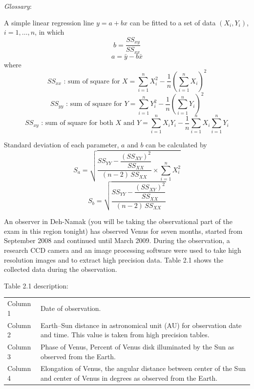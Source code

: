 \textit{Glossary}:

A simple linear regression line $y = a + bx$ can be fitted to a set of data
$(X_i, Y_i)$, $i = 1, \ldots, n$, in which
\[ b = \frac{SS_{xy}}{SS_{xx}} \]
\[ a = \bar{y} - b\bar{x} \]
where
\[ SS_{xx} \text{ : sum of square for } X
   = \sum_{i=1}^{n} X_i^2
   - \frac{1}{n}\left( \sum_{i=1}^{n} X_i \right)^2 \]
\[ SS_{yy} \text{ : sum of square for } Y
   = \sum_{i=1}^{n} Y_i^2
   - \frac{1}{n}\left( \sum_{i=1}^{n} Y_i \right)^2 \]
\[ SS_{xy} \text{ : sum of square for both } X \text{ and } Y
   = \sum_{i=1}^{n} X_i Y_i
   - \frac{1}{n} \sum_{i=1}^{n} X_i \sum_{i=1}^{n} Y_i \]

Standard deviation of each parameter, $a$ and $b$ can be calculated by
\[ S_a = \sqrt{ \frac{SS_{YY} - \dfrac{(SS_{XY})^2}{SS_{XX}}}
   {(n-2)\,SS_{XX}} \times \sum_{i=1}^{n} X_i^2 } \]
\[ S_b = \sqrt{ \frac{SS_{YY} - \dfrac{(SS_{XY})^2}{SS_{XX}}}
   {(n-2)\,SS_{XX}} } \]

An observer in Deh-Namak (you will be taking the observational part of the
exam in this region tonight) has observed Venus for seven months, started
from September 2008 and continued until March 2009. During the observation, a
research CCD camera and an image processing software were used to take high
resolution images and to extract high precision data. Table 2.1 shows the
collected data during the observation.

Table 2.1 description:
\begin{center}
\begin{tabular}{lp{9cm}}
Column 1 & Date of observation. \\
Column 2 & Earth--Sun distance in astronomical unit (AU) for observation
  date and time. This value is taken from high precision tables. \\
Column 3 & Phase of Venus, Percent of Venus disk illuminated by the Sun as
  observed from the Earth. \\
Column 4 & Elongation of Venus, the angular distance between center of the
  Sun and center of Venus in degrees as observed from the Earth. \\
\end{tabular}
\end{center}

